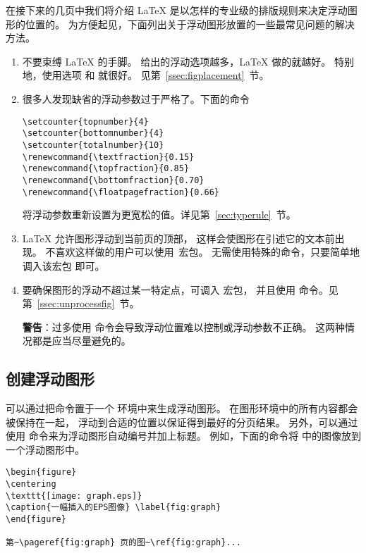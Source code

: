 在接下来的几页中我们将介绍 \LaTeX{} 是以怎样的专业级的排版规则来决定浮动图形的位置的。
为方便起见，下面列出关于浮动图形放置的一些最常见问题的解决方法。
\begin{enumerate}
	\item 不要束缚 \LaTeX{} 的手脚。
	给出的浮动选项越多，\LaTeX{} 做的就越好。
	特别地，使用选项 \opt{[htbp]} 和 \opt{[tbp]}	就很好。
	见第~\ref{ssec:figplacement}~节。
	
	\item 很多人发现缺省的浮动参数过于严格了。下面的命令
\begin{lstlisting}
\setcounter{topnumber}{4}
\setcounter{bottomnumber}{4}
\setcounter{totalnumber}{10}
\renewcommand{\textfraction}{0.15}
\renewcommand{\topfraction}{0.85}
\renewcommand{\bottomfraction}{0.70}
\renewcommand{\floatpagefraction}{0.66}
\end{lstlisting}
	将浮动参数重新设置为更宽松的值。详见第~\ref{sec:typerule}~节。
	
	\item \LaTeX{} 允许图形浮动到当前页的顶部，
	这样会使图形在引述它的文本前出现。
	不喜欢这样做的用户可以使用~宏包。
	无需使用特殊的命令，只要简单地调入该宏包  即可。
	
	\item 要确保图形的浮动不超过某一特定点，可调入  宏包，
	并且使用  命令。见第~\ref{ssec:unprocessfig}~节。
	
	\textbf{警告}：过多使用 	命令会导致浮动位置难以控制或浮动参数不正确。
	这两种情况都是应当尽量避免的。
\end{enumerate}

\subsection{创建浮动图形}
可以通过把命令置于一个  环境中来生成浮动图形。
在图形环境中的所有内容都会被保持在一起，
浮动到合适的位置以保证得到最好的分页结果。
另外，可以通过使用  命令来为浮动图形自动编号并加上标题。
例如，下面的命令将  中的图像放到一个浮动图形中。
\begin{lstlisting}
\begin{figure} 
\centering 
\texttt{[image: graph.eps]} 
\caption{一幅插入的EPS图像} \label{fig:graph} 
\end{figure}

第~\pageref{fig:graph} 页的图~\ref{fig:graph}...
\end{lstlisting}

